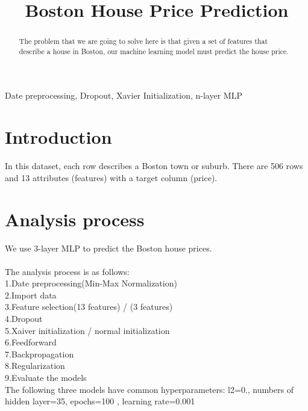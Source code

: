 \documentclass[conference]{IEEEtran}
\begin{document}
\title{Boston House Price Prediction\\
{\footnotesize}}

\author{}
\maketitle

\begin{abstract}
The problem that we are going to solve here is that given a set of features that describe a house in Boston, our machine learning model must predict the house price.

\end{abstract}


\begin{IEEEkeywords}
Date preprocessing, Dropout, Xavier Initialization, n-layer MLP
\end{IEEEkeywords}


\section{Introduction}
In this dataset, each row describes a Boston town or suburb. There are 506 rows and 13 attributes (features) with a target column (price).\\


\section{Analysis process}
We use 3-layer MLP to predict the Boston house prices.\\
~\\
The analysis process is as follows:\\
1.Date preprocessing(Min-Max Normalization) \\
2.Import data\\
3.Feature selection(13 features) / (3 features)\\
4.Dropout \\
5.Xaiver initialization / normal initialization\\
6.Feedforward \\
7.Backpropagation\\
8.Regularization\\
9.Evaluate the models\\

The following three models have common hyperparameters: l2=0., numbers of hidden layer=35,  epochs=100 , learning rate=0.001
\end{document}

